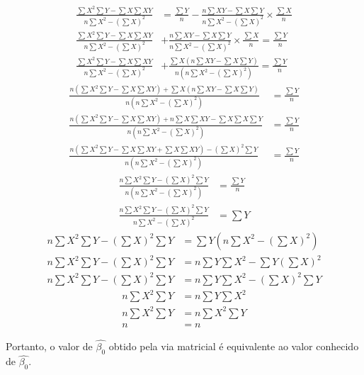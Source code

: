 \documentclass[]{ufpe-exercises}
\begin{document}
\begin{questions}
\begin{solution}
		\begin{align*}
			\frac{\sum X^{2}\sum Y - \sum X\sum XY}{n\sum X^{2} - (\sum X)^{2}} & = \frac{\sum Y}{n} - \frac{n\sum XY - \sum X\sum Y}{n\sum X^{2} - (\sum X)^{2}} \times  \frac{\sum X}{n} \\
			\frac{\sum X^{2}\sum Y - \sum X\sum XY}{n\sum X^{2} - (\sum X)^{2}} & + \frac{n \sum XY - \sum X\sum Y}{n\sum X^{2} - (\sum X)^{2}} \times \frac{\sum X}{n} = \frac{\sum Y}{n} \\
			\frac{\sum X^{2}\sum Y - \sum X\sum XY}{n\sum X^{2} - (\sum X)^{2}} & + \frac{\sum X(n\sum XY - \sum X\sum Y)}{n(n \sum X^{2} - (\sum X)^{2})} = \frac{\sum Y}{n}
		\end{align*}
		\begin{align*}
			\frac{n(\sum X^{2}\sum Y - \sum X\sum XY) + \sum X(n\sum XY - \sum X\sum Y)}{n(n \sum X^{2} - (\sum X)^{2})}      & = \frac{\sum Y}{n} \\
			\frac{n(\sum X^{2}\sum Y - \sum X\sum XY) + n\sum X\sum XY - \sum X\sum X\sum Y}{n(n \sum X^{2} - (\sum X)^{2})}  & = \frac{\sum Y}{n} \\
			\frac{n(\sum X^{2}\sum Y - \sum X\sum XY + \sum X\sum XY) - (\sum X)^{2}  \sum Y}{n(n \sum X^{2} - (\sum X)^{2})} & = \frac{\sum Y}{n}
		\end{align*}
		\begin{align*}
			\frac{n\sum X^{2}\sum Y - (\sum X)^{2}  \sum Y}{n(n\sum X^{2} - (\sum X)^{2})} & = \frac{\sum Y}{n} \\
			\frac{n\sum X^{2}\sum Y - (\sum X)^{2}  \sum Y}{n\sum X^{2} - (\sum X)^{2}}    & = \sum Y
		\end{align*}
		\begin{align*}
			n\sum X^{2}\sum Y - (\sum X)^{2}\sum Y & = \sum Y(n \sum X^{2} - (\sum X)^{2})    \\
			n\sum X^{2}\sum Y - (\sum X)^{2}\sum Y & = n\sum Y\sum X^{2} - \sum Y(\sum X)^{2} \\
			n\sum X^{2}\sum Y - (\sum X)^{2}\sum Y & = n\sum Y\sum X^{2} - (\sum X)^{2}\sum Y
		\end{align*}
		\begin{align*}
			n\sum X^{2}\sum Y & = n\sum Y\sum X^{2} \\
			n\sum X^{2}\sum Y & = n\sum X^{2}\sum Y \\
			n                 & = n
		\end{align*}


		Portanto, o valor de \(\hat{\beta_{0}}\) obtido pela via matricial é equivalente ao valor conhecido de \(\hat{\beta_{0}}\).


\end{solution}
\end{questions}
\end{document}
